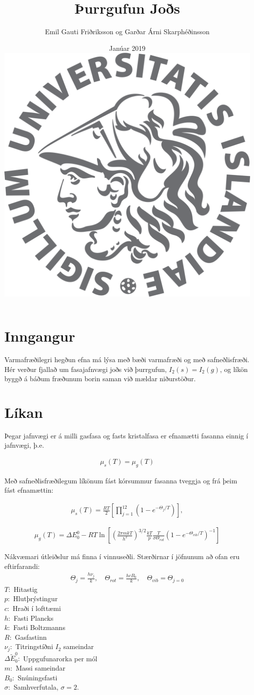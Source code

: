\documentclass[11pt]{article}
\title{{\Huge Þurrgufun Joðs}}
\author{Emil Gauti Friðriksson og Garðar Árni Skarphéðinsson}
\date{Janúar 2019 \\
\vspace{5cm}
\includegraphics[width = .6\textwidth]{HIlogo1.png}}
\begin{document}
\maketitle
\thispagestyle{empty}

\newpage

\section{Inngangur}
Varmafræðilegri hegðun efna má lýsa með bæði varmafræði og með safneðlisfræði. Hér verður fjallað um fasajafnvægi joðs við þurrgufun, $I_2(s) = I_2(g)$, og líkön byggð á báðum fræðunum borin saman við mældar niðurstöður. \\

\section{Líkan}
Þegar jafnvægi er á milli gasfasa og fasts kristalfasa er efnamætti fasanna einnig í jafnvægi, þ.e.

\begin{align}
\mu_s(T) = \mu_g(T)
\end{align}

Með safneðlisfræðilegum líkönum fást kórsummur fasanna tveggja og frá þeim fást efnamættin:

\begin{align}
\mu_s(T) = \frac{RT}{2} \left[\displaystyle\prod_{j=1}^{12} (1 - e^{-\Theta_j/T}) \right],
\end{align}

\begin{align}
\mu_g(T) = \Delta E_0^0 - RT\ln\left[\left(\frac{2\pi mkT}{h^2}\right)^{3/2} \frac{kT}{p}\frac{T}{\sigma\Theta_{rot}} (1 - e^{-\Theta_{vib}/T})^{-1} \right]
\end{align}

Nákvæmari útleiðslur má finna í vinnuseðli. Stærðirnar í jöfnunum að ofan eru eftirfarandi:\\
\begin{align}
\Theta_j = \frac{h\nu_j}{k}, \quad \Theta_{rot} = \frac{hcB_0}{k}, \quad \Theta_{vib} = \Theta_{j=0} \label{eq:theta}
\end{align}
$T:$ Hitastig\\
$p:$ Hlutþrýstingur\\
$c:$ Hraði  í lofttæmi\\
$h:$ Fasti Plancks\\
$k:$ Fasti Boltzmanns\\
$R:$ Gasfastinn\\
$\nu_j:$ Titringstíðni $I_2$ sameindar\\
$\Delta \widetilde{E}_0^0:$ Uppgufunarorka per mól\\
$m:$ Massi sameindar\\
$B_0:$ Snúningsfasti\\
$\sigma:$ Samhverfutala, $\sigma = 2$.\\
\\
\end{document}
